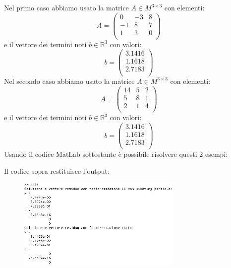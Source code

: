 \label{es314}
\begin{flushleft}
Nel primo caso abbiamo usato la matrice $A\in M^{3\times 3}$ con elementi:
\[ 
A =
\begin{pmatrix}
    0 & -3 &  8 \\
   -1  &  8  &  7 \\
    1  &  3  &  0 \\
\end{pmatrix}
\]
e il vettore dei termini noti $b\in \mathbb{R}^3$ con valori:
\[
b = \begin{pmatrix}
    3.1416 \\
    1.1618 \\
    2.7183 \\
\end{pmatrix}
\]
Nel secondo caso abbiamo usato la matrice $A\in M^{3\times 3}$ con elementi:
\[ 
A =
\begin{pmatrix}
    14 & 5 &  2 \\
    5 &  8  &  1 \\
    2  &  1  &  4 \\
\end{pmatrix}
\]
e il vettore dei termini noti $b\in \mathbb{R}^3$ con valori:
\[
b = \begin{pmatrix}
    3.1416 \\
    1.1618 \\
    2.7183 \\
\end{pmatrix}
\]
Usando il codice MatLab sottostante è possibile risolvere questi 2 esempi:

Il codice sopra restituisce l'output:
\begin{figure}[H]
\includegraphics[left, width=300px]{cap_3/es14/es314.png}
\end{figure}
\end{flushleft}